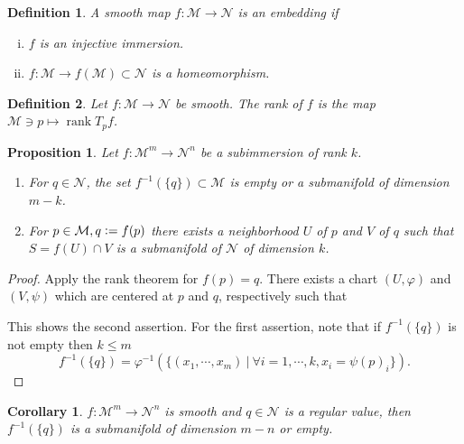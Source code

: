 \documentclass[10pt]{article}
\newtheorem{proposition}{Proposition}[section]
\newtheorem{definition}{Definition}[section]
\newtheorem{corollary}{Corollary} [section]
\DeclareMathOperator{\rank}{rank}
\newcommand{\defeq}{\vcentcolon=}
\newcommand{\R}[0]{\mathbb{R}}
\newcommand{\M}[0]{\mathcal{M}}
\newcommand{\maniN}[0]{\mathcal{N}}
\newcommand{\sep}[0]{\:|\:}
\begin{document}
\begin{definition}
  A smooth map $f:\M\to\maniN$ is an embedding if 
  \begin{enumerate}[i).]
    \item $f$ is an injective immersion.
    \item $f:\M\to f(\M)\subset\maniN$ is a homeomorphism.
  \end{enumerate}
\end{definition}
\begin{definition}
  Let $f:\M\to\maniN$ be smooth. The rank of $f$ is the map $\M\ni p\mapsto \rank T_pf$.
\end{definition}
\begin{proposition}
  Let $f:\M^m\to\maniN^n$ be a subimmersion of rank $k$. 
  \begin{enumerate}[1).]
    \item For $q\in\maniN$, the set $f^{-1}(\{q\})\subset\M$ is empty or a submanifold of dimension $m-k$.
    \item For $p\in\M, q\defeq f(p)$ there exists a  neighborhood $U$ of $p$ and $V$ of $q$ such that $S=f(U)\cap V$ is a submanifold of $\maniN$ of dimension $k$.
  \end{enumerate}
\end{proposition}
\begin{proof}
  Apply the rank theorem for $f(p) = q$. There exists a chart $(U,\varphi)$ and $(V,\psi)$ which are centered at $p$ and $q$, respectively such that 
  \begin{center}
  \end{center}
  This shows the second assertion. For the first assertion, note that if $f^{-1}(\{q\})$ is not empty then $k\leq m$
  \begin{equation*}
    f^{-1}(\{q\}) = \varphi^{-1}(\{(x_1,\cdots,x_m)\sep \forall i = 1,\cdots,k, x_i = \psi(p)_i\}).
  \end{equation*}
\end{proof}
\begin{corollary}
  $f:\M^m\to\maniN^n$ is smooth and $q\in \maniN$ is a regular value, then $f^{-1}(\{q\})$ is a submanifold of dimension $m-n$ or empty.
\end{corollary}
\end{document}

